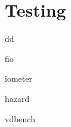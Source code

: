 \chapter{Testing}

\begin{enumbox}
    \item dd
    \item fio
    \item iometer
    \item hazard
    \item vdbench
\end{enumbox}

